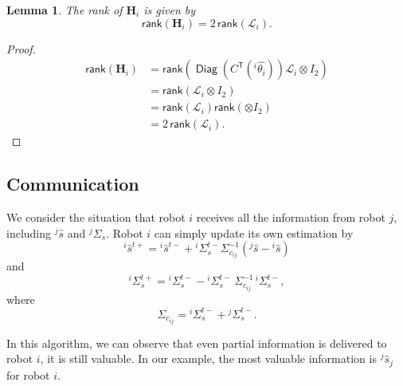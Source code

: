 \documentclass[xcolor=x11names]{article}
\DeclareMathOperator\Diag{\mathsf{Diag}}
\DeclareMathOperator\T{\mathsf{T}}
\newtheorem{lemma}{Lemma}
\begin{document}
\begin{lemma}
   The rank of  $\mathbf{H}_i$ is given by
   \begin{equation}
      \mathsf{rank}\left( \mathbf{H}_i  \right) = 2 \, \mathsf{rank}\left( \mathcal{L}_i  \right).
   \end{equation}
\end{lemma}
\begin{proof}
   \begin{align*}
      \mathsf{rank}\left( \mathbf{H}_i  \right) &= \mathsf{rank}\left( \Diag\left( C^{\T}({}^i\hat{\theta_i}) \right) \mathcal{L}_i \otimes I_2 \right)  \\  
           &= \mathsf{rank}\left(  \mathcal{L}_i \otimes I_2 \right)  \\  
           &= \mathsf{rank}\left(  \mathcal{L}_i \right)  \mathsf{rank}\left( \otimes I_2 \right)  \\  
           &= 2 \, \mathsf{rank}\left(  \mathcal{L}_i \right).  
   \end{align*}
\end{proof}


\subsection{Communication}
   We consider the situation that robot $i$ receives all the information from robot $j$, including $^j\hat{s}$ and $^j\Sigma_s$. Robot $i$ can simply update its own estimation by
   \begin{equation}
      ^i\hat{s}^{t+} = {}^i\hat{s}^{t-} + {}^i\Sigma^{t-}_{s} \Sigma_{c_{ij}}^{-1} ({}^j\hat{s}  - {}^i\hat{s})
   \end{equation}  
and 
   \begin{equation}
      {}^i\Sigma^{t+}_{s} = {}^i\Sigma^{t-}_{s} - {}^i\Sigma^{t-}_{s} \,  \Sigma_{c_{ij}}^{-1} \, {}^i\Sigma^{t-}_{s},
      \label{eq:comm_cov_update}
   \end{equation}       
where
   \begin{equation}
      \Sigma_{c_{ij}} = {}^i\Sigma^{t-}_{s} + {}^j\Sigma^{t-}_{s}.
   \end{equation}       
   
   
   In this algorithm, we can observe that even partial information is delivered to robot $i$, it is still valuable. In our example, the most valuable information is $^j\hat{s}_j$ for robot $i$.
\end{document}
